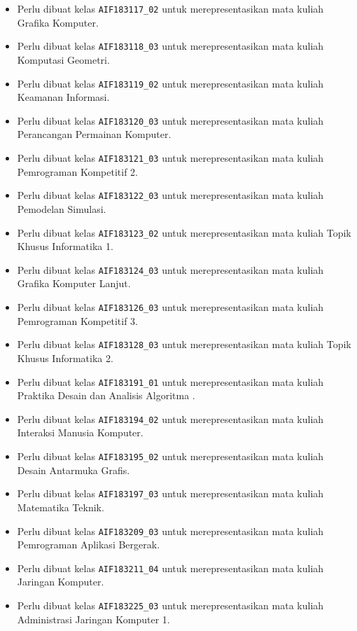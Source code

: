 \documentclass[a4paper,twoside]{article}
\begin{document}
\begin{enumerate}
\begin{enumerate}
\begin{enumerate}
\begin{itemize}
					\item Perlu dibuat kelas \texttt{AIF183117\_02} untuk merepresentasikan mata kuliah Grafika Komputer.
					\item Perlu dibuat kelas \texttt{AIF183118\_03} untuk merepresentasikan mata kuliah Komputasi Geometri.
					\item Perlu dibuat kelas \texttt{AIF183119\_02} untuk merepresentasikan mata kuliah Keamanan Informasi.
					\item Perlu dibuat kelas \texttt{AIF183120\_03} untuk merepresentasikan mata kuliah Perancangan Permainan Komputer.
					\item Perlu dibuat kelas \texttt{AIF183121\_03} untuk merepresentasikan mata kuliah Pemrograman Kompetitif 2.
					\item Perlu dibuat kelas \texttt{AIF183122\_03} untuk merepresentasikan mata kuliah Pemodelan Simulasi.
					\item Perlu dibuat kelas \texttt{AIF183123\_02} untuk merepresentasikan mata kuliah Topik Khusus Informatika 1.
					\item Perlu dibuat kelas \texttt{AIF183124\_03} untuk merepresentasikan mata kuliah Grafika Komputer Lanjut.
					\item Perlu dibuat kelas \texttt{AIF183126\_03} untuk merepresentasikan mata kuliah Pemrograman Kompetitif 3.
					\item Perlu dibuat kelas \texttt{AIF183128\_03} untuk merepresentasikan mata kuliah Topik Khusus Informatika 2.
					\item Perlu dibuat kelas \texttt{AIF183191\_01} untuk merepresentasikan mata kuliah Praktika Desain dan Analisis Algoritma .
					\item Perlu dibuat kelas \texttt{AIF183194\_02} untuk merepresentasikan mata kuliah Interaksi Manusia Komputer.
					\item Perlu dibuat kelas \texttt{AIF183195\_02} untuk merepresentasikan mata kuliah Desain Antarmuka Grafis.
					\item Perlu dibuat kelas \texttt{AIF183197\_03} untuk merepresentasikan mata kuliah Matematika Teknik.
					\item Perlu dibuat kelas \texttt{AIF183209\_03} untuk merepresentasikan mata kuliah Pemrograman Aplikasi Bergerak.
					\item Perlu dibuat kelas \texttt{AIF183211\_04} untuk merepresentasikan mata kuliah Jaringan Komputer.
					\item Perlu dibuat kelas \texttt{AIF183225\_03} untuk merepresentasikan mata kuliah Administrasi Jaringan Komputer 1.

\end{itemize}
\end{enumerate}
\end{enumerate}
\end{enumerate}
\end{document}
